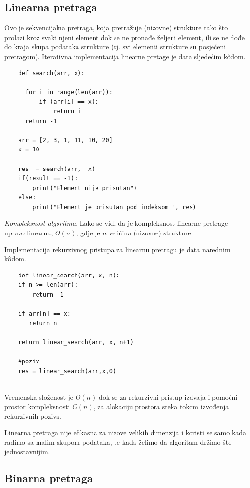 \subsection{Linearna pretraga}
Ovo je sekvencijalna pretraga, koja pretražuje (nizovne) strukture tako što prolazi kroz svaki njeni element dok se ne pronađe željeni element,  ili se ne dođe do kraja skupa podataka strukture (tj. svi elementi strukture su posjećeni pretragom).  Iterativna implementacija linearne pretage je data sljedećim k\^odom.

\begin{verbatim}
	def search(arr, x):
	
	  for i in range(len(arr)):
	      if (arr[i] == x):
	          return i
	  return -1
	
	arr = [2, 3, 1, 11, 10, 20]
	x = 10
	
	res  = search(arr,  x)
	if(result == -1):
	    print("Element nije prisutan")
	else:
	    print("Element je prisutan pod indeksom ", res)
\end{verbatim}
\textit{Kompleksnost algoritma}. Lako se vidi da je kompleksnost linearne pretrage upravo linearna, $O(n)$, gdje je $n$ veličina (nizovne) strukture. 

Implementacija rekurzivnog pristupa za linearnu pretragu je data narednim k\^odom.

\begin{verbatim}
	def linear_search(arr, x, n):
	if n >= len(arr):
	    return -1
	
	if arr[n] == x:
	   return n
	
	return linear_search(arr, x, n+1)
	
	#poziv 
	res = linear_search(arr,x,0)
	
\end{verbatim}

Vremenska složenost je $O(n)$ dok se za rekurzivni pristup izdvaja i pomoćni prostor kompleksnosti $O(n)$, za alokaciju prostora steka tokom izvođenja rekurzivnih poziva.


Linearna pretraga nije efikasna za nizove velikih dimenzija i koristi se samo kada radimo sa malim skupom podataka, te kada želimo da algoritam držimo što jednostavnijim.
\subsection{Binarna pretraga}

